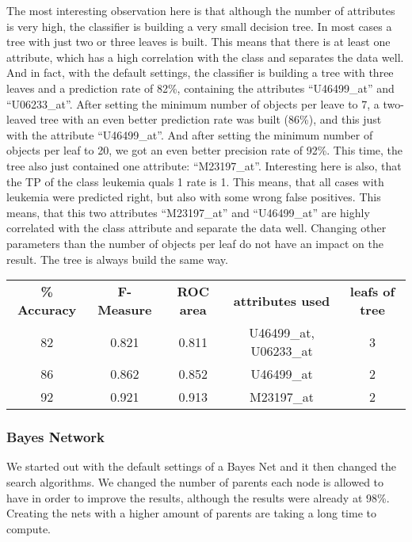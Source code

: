 \documentclass{article}
\begin{document}
The most interesting observation here is that although the number of attributes is very high, the classifier is building a very small decision tree. In most cases a tree with just two or three leaves is built. This means that there is at least one attribute, which has a high correlation with the class and separates the data well. And in fact, with the default settings, the classifier is building a tree with three leaves and a prediction rate of 82\%, containing the attributes “U46499\_at” and “U06233\_at”. After setting the minimum number of objects per leave to 7, a two-leaved tree with an even better prediction rate was built (86\%), and this just with the attribute “U46499\_at”. And after setting the minimum number of objects per leaf to 20, we got an even better precision rate of 92\%. This time, the tree also just contained one attribute: “M23197\_at”. Interesting here is also, that the TP of the class leukemia quals 1 rate is 1. This means, that all cases with leukemia were predicted right, but also with some wrong false positives. This means, that this two attributes “M23197\_at” and “U46499\_at” are highly correlated with the class attribute and separate the data well. 
Changing other parameters than the number of objects per leaf do not have an impact on the result. The tree is always build the same way. 

\begin{center}
\begin{tabular}{ c | c | c | c |  c }
\textbf{\% Accuracy} & \textbf{F-Measure} & \textbf{ROC area} & \textbf{attributes used} & \textbf{leafs of tree}\\
82 & 0.821 & 0.811 & U46499\_at, U06233\_at & 3 \\
86 & 0.862 & 0.852 & U46499\_at & 2 \\
92 & 0.921 & 0.913 & M23197\_at & 2 \\
\end{tabular}
\end{center}

\subsubsection{Bayes Network}
We started out with the default settings of a Bayes Net and it then changed the search algorithms. We changed the number of parents each node is allowed to have in order to improve the results, although the results were already at 98\%. Creating the nets with a higher amount of parents are taking a long time to compute.
\end{document}
